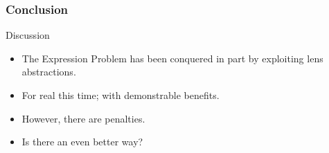 \begin{frame}
\frametitle{Conclusion}
\begin{block}{Discussion}
\begin{itemize}
\item<1-> The Expression Problem has been conquered in part by exploiting lens abstractions.
\item<2-> For real this time; with demonstrable benefits.
\item<3-> However, there are penalties.
\item<4-> Is there an even better way?
\end{itemize}
\end{block}
\end{frame}
